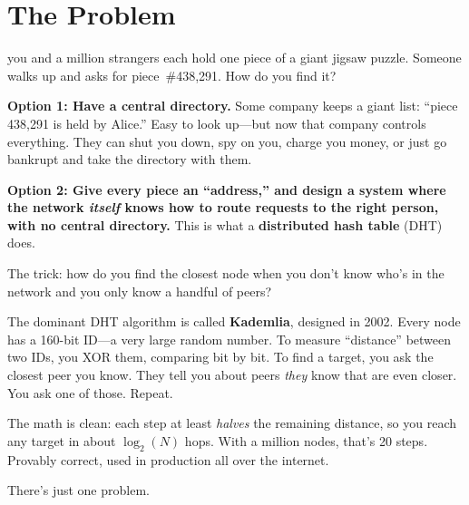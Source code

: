 \documentclass[nobib]{tufte-handout}
\begin{document}
\section{The Problem}

 you and a million strangers each hold one piece of a giant jigsaw puzzle. Someone walks up and asks for piece~\#438{,}291. How do you find it?

\textbf{Option 1: Have a central directory.} Some company keeps a giant list: ``piece 438{,}291 is held by Alice.'' Easy to look up---but now that company controls everything. They can shut you down, spy on you, charge you money, or just go bankrupt and take the directory with them.

\textbf{Option 2: Give every piece an ``address,'' and design a system where the network \emph{itself} knows how to route requests to the right person, with no central directory.} This is what a \textbf{distributed hash table} (DHT) does.

The trick: how do you find the closest node when you don't know who's in the network and you only know a handful of peers?

The dominant DHT algorithm is called \textbf{Kademlia}, designed in 2002. Every node has a 160-bit ID---a very large random number. To measure ``distance'' between two IDs, you XOR them, comparing bit by bit. To find a target, you ask the closest peer you know. They tell you about peers \emph{they} know that are even closer. You ask one of those. Repeat.

The math is clean: each step at least \emph{halves} the remaining distance, so you reach any target in about $\log_2(N)$ hops. With a million nodes, that's 20 steps. Provably correct, used in production all over the internet.

There's just one problem.
\end{document}
